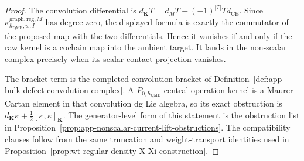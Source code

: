 \begin{proof}
  The convolution differential is
  \(d_{\mathbf K}T=d_MT-(-1)^{|T|}Td_{\mathrm{CE}}\).  Since
  \(\kappa^{\mathrm{graph,reg},M}_{\hbar_{\mathrm{QME}},w,I}\) has degree zero, the
  displayed formula is exactly the commutator of the proposed map with the
  two differentials.  Hence it vanishes if and only if the raw kernel is a
  cochain map into the ambient target.  It lands in the non-scalar complex
  precisely when its scalar-contact projection vanishes.

  The bracket term is the completed convolution bracket of
  Definition~\ref{def:app-bulk-defect-convolution-complex}.  A
  \(P_{0,\hbar_{\mathrm{QME}}}\)-central-operation kernel is a Maurer--Cartan element in
  that convolution dg Lie algebra, so its exact obstruction is
  \(d_{\mathbf K}\kappa+\frac12[\kappa,\kappa]_{\mathbf K}\).  The
  generator-level form of this statement is the obstruction list in
  Proposition~\ref{prop:app-nonscalar-current-lift-obstructions}.  The
  compatibility clauses follow from the same truncation and weight-transport
  identities used in
  Proposition~\ref{prop:wt-regular-density-X-Xi-construction}.
\end{proof}

